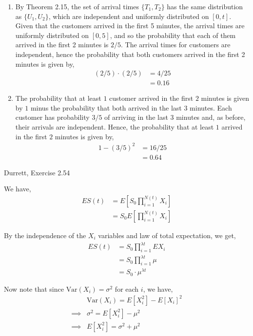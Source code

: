 \documentclass[12pt]{article}
\newenvironment{problem}[2][Problem]{\begin{trivlist}
\item[\hskip \labelsep {\bfseries #1}\hskip \labelsep {\bfseries #2.}]}{\end{trivlist}}
\begin{document}
\begin{enumerate}[label=\alph*]

\item By Theorem 2.15, the set of arrival times $\{T_1, T_2\}$ has the same distribution as $\{U_1, U_2\}$, which are independent and uniformly distributed on $[0, t]$. Given that the customers arrived in the first 5 minutes, the arrival times are uniformly distributed on $[0, 5]$, and so the probability that each of them arrived in the first 2 minutes is $2/5$. The arrival times for customers are independent, hence the probability that both customers arrived in the first 2 minutes is given by,
\begin{align*}
(2/5) \cdot (2/5) &= 4/25\\
&= 0.16
\end{align*}

\item The probability that at least $1$ customer arrived in the first $2$ minutes is given by $1$ minus the probability that both arrived in the last $3$ minutes. Each customer has probability $3/5$ of arriving in the last $3$ minutes and, as before, their arrivals are independent. Hence, the probability that at least $1$ arrived in the first $2$ minutes is given by,
\begin{align*}
1 - (3/5)^2 &= 16/25\\
&= 0.64
\end{align*}

\end{enumerate}

\newpage

\begin{problem}{3}
Durrett, Exercise 2.54
\end{problem}

We have,
\begin{align*}
ES(t) &= E \left[ S_0 \prod_{i = 1}^{N(t)} X_i \right]\\
&= S_0 E \left [ \prod_{i = 1}^{N(t)} X_i \right]
\end{align*}

By the independence of the $X_i$ variables and law of total expectation, we get,
\begin{align*}
ES(t) &= S_0 \prod_{i = 1}^{\lambda t} EX_i\\
&= S_0 \prod_{i=1}^{\lambda t} \mu\\
&= S_0 \cdot \mu^{\lambda t}
\end{align*}

Now note that since $\text{Var}(X_i) = \sigma^2$ for each $i$, we have,
\begin{align*}
&\text{Var}(X_i) = E[X_i^2] - E[X_i]^2\\
\implies &\sigma^2 = E[X_i^2] - \mu^2\\
\implies &E[X_i^2] = \sigma^2 + \mu^2
\end{align*}
\end{document}
